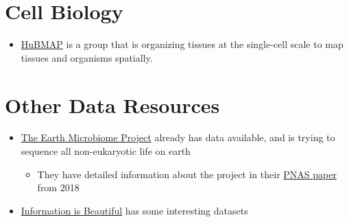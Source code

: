 \documentclass[]{book}
\providecommand{\tightlist}{%
  \setlength{\itemsep}{0pt}\setlength{\parskip}{0pt}}
\begin{document}
\hypertarget{cell-biology}{%
\section{Cell Biology}\label{cell-biology}}

\begin{itemize}
\tightlist
\item
  \href{https://hubmapconsortium.org/}{HuBMAP} is a group that is organizing tissues at the single-cell scale to map tissues and organisms spatially.
\end{itemize}

\hypertarget{other-data-resources}{%
\section{Other Data Resources}\label{other-data-resources}}

\begin{itemize}
\tightlist
\item
  \href{http://www.earthmicrobiome.org/data-and-code/}{The Earth Microbiome Project} already has data available, and is trying to sequence all non-eukaryotic life on earth

  \begin{itemize}
  \tightlist
  \item
    They have detailed information about the project in their \href{http://www.pnas.org/content/115/17/4325.long}{PNAS paper} from 2018
  \end{itemize}
\item
  \href{https://informationisbeautiful.net/}{Information is Beautiful} has some interesting datasets
\end{itemize}


\end{document}
